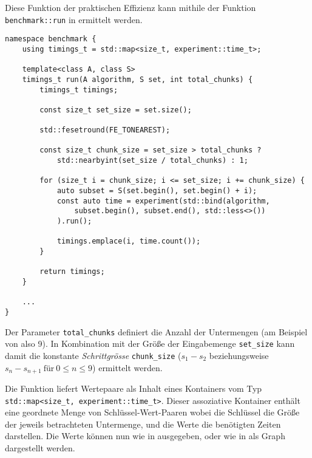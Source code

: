 

Diese Funktion der praktischen Effizienz kann mithile der Funktion \linebreak[4]\lstinline{benchmark::run} in  ermittelt werden.

\begin{lstlisting}[label=lst:benchmark, caption={Implementation einer Funktion zur Ermittlung der praktischen Effizienz eines Algorotihmus mit einer bestimmenten Eingabemenge.}]
namespace benchmark {
	using timings_t = std::map<size_t, experiment::time_t>;

	template<class A, class S>
	timings_t run(A algorithm, S set, int total_chunks) {
		timings_t timings;

		const size_t set_size = set.size();

		std::fesetround(FE_TONEAREST);

		const size_t chunk_size = set_size > total_chunks ?
			std::nearbyint(set_size / total_chunks) : 1;

		for (size_t i = chunk_size; i <= set_size; i += chunk_size) {
			auto subset = S(set.begin(), set.begin() + i);
			const auto time = experiment(std::bind(algorithm,
				subset.begin(), subset.end(), std::less<>())
			).run();

			timings.emplace(i, time.count());
		}

		return timings;
	}
	
	...
}
\end{lstlisting}

Der Parameter \lstinline{total_chunks} definiert die Anzahl der Untermengen (am Beispiel von  also 9). In Kombination mit der Größe der Eingabemenge \lstinline{set_size} kann damit die konstante \emph{Schrittgrösse} \lstinline{chunk_size} ($s_1 - s_2$ beziehungsweise $s_n - s_{n + 1}\ \text{für}\ 0 \leq n \le 9$) ermittelt werden.

Die Funktion liefert Wertepaare als Inhalt eines Kontainers vom Typ \lstinline{std::map<size_t, experiment::time_t>}. Dieser assoziative Kontainer enthält eine geordnete Menge von Schlüssel-Wert-Paaren wobei die Schlüssel die Größe der jeweils betrachteten Untermenge, und die Werte die benötigten Zeiten darstellen. Die Werte können nun wie in  ausgegeben, oder wie in  als Graph dargestellt werden.

